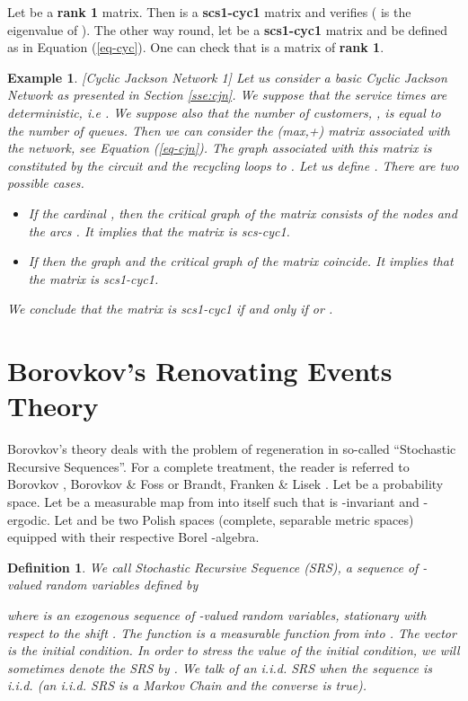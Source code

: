 \documentclass[11pt,titlepage]{article}
\def\eref#1{(\ref{#1})}
\newtheorem{defi}[theo]{Definition }
\newtheorem{example}[theo]{Example }
\newenvironment{exam}{\begin{example}\rm}{\end{example}}
\begin{document}
Let  be a {\bf rank 1} matrix. Then  is a {\bf scs1-cyc1} matrix and
verifies  ( is the eigenvalue of ).
The other way round, let  be a {\bf scs1-cyc1} matrix and  
be defined as in Equation \eref{eq-cyc}. One can
check that  is a matrix of {\bf rank 1}.


\begin{exam}[Cyclic Jackson Network 1] 
\label{ex:jak1}
Let us consider a basic Cyclic Jackson Network as presented in Section
\ref{sse:cjn}. We suppose that the service times are deterministic, i.e
. We suppose also that the number of customers,
, is 
equal to the number of queues. Then we can consider the (max,+) matrix
associated with the network, see Equation (\ref{eq-cjn}). 
The graph associated with this matrix is constituted by the
circuit  and the recycling loops  to . 
Let us define . There are two possible
cases.
\begin{itemize}
\item If the cardinal , then the critical graph of the matrix consists of the nodes  and the arcs . It implies
that the matrix is scs-cyc1.
\item If  then the graph and the critical graph of the matrix
coincide. It implies that the matrix is scs1-cyc1.
\end{itemize}
We conclude that the matrix is scs1-cyc1 if and only if  or . 
\end{exam}

\section{Borovkov's Renovating Events Theory}
\label{se:bret}
Borovkov's theory deals with the problem of regeneration in so-called
``Stochastic Recursive 
Sequences''. For a complete treatment, the reader is referred to Borovkov
\cite{boro84}, Borovkov \& Foss \cite{BoFo92,BoFo94}
or Brandt, Franken \& Lisek \cite{BFLi}. Let  be a probability space. Let  be a measurable map from
 into itself such that  is -invariant and
-ergodic. Let  and  be two Polish spaces 
(complete, separable metric spaces) equipped with their respective Borel 
-algebra. 

\begin{defi}
We call Stochastic Recursive
Sequence (SRS), a sequence  of -valued random variables
defined by  

where   is an exogenous sequence of -valued random variables,
stationary with respect to
the shift . The function  is a measurable function from
 into 
. The vector  is the initial condition. In order to stress the
value of the initial condition, 
we will sometimes denote the SRS by .
We talk of an i.i.d. SRS when the sequence  is i.i.d. (an i.i.d.
SRS is a Markov 
Chain and the converse is true).
\label{srs}
\end{defi}
\end{document}
